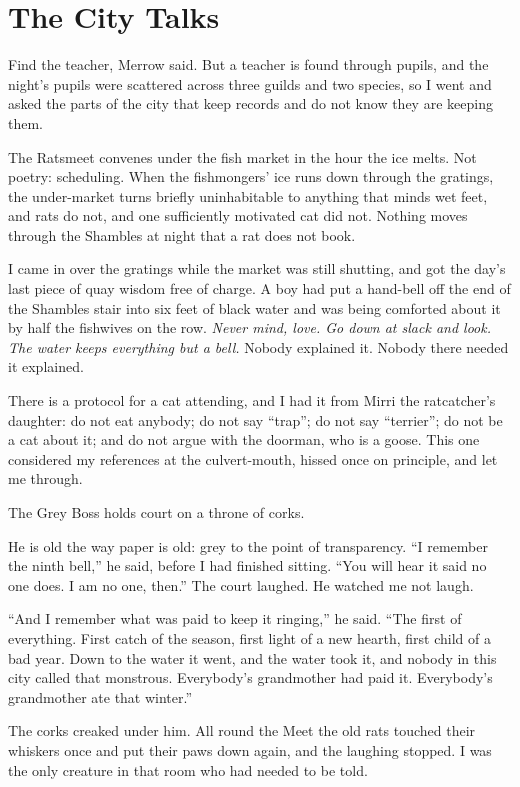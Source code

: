 \chapter{The City Talks}

Find the teacher, Merrow said. But a teacher is found through pupils, and the night's pupils were scattered across three guilds and two species, so I went and asked the parts of the city that keep records and do not know they are keeping them.

The Ratsmeet convenes under the fish market in the hour the ice melts. Not poetry: scheduling. When the fishmongers' ice runs down through the gratings, the under-market turns briefly uninhabitable to anything that minds wet feet, and rats do not, and one sufficiently motivated cat did not. Nothing moves through the Shambles at night that a rat does not book.

I came in over the gratings while the market was still shutting, and got the day's last piece of quay wisdom free of charge. A boy had put a hand-bell off the end of the Shambles stair into six feet of black water and was being comforted about it by half the fishwives on the row. \emph{Never mind, love. Go down at slack and look. The water keeps everything but a bell.} Nobody explained it. Nobody there needed it explained.

There is a protocol for a cat attending, and I had it from Mirri the ratcatcher's daughter: do not eat anybody; do not say ``trap''; do not say ``terrier''; do not be a cat about it; and do not argue with the doorman, who is a goose. This one considered my references at the culvert-mouth, hissed once on principle, and let me through.

The Grey Boss holds court on a throne of corks.

He is old the way paper is old: grey to the point of transparency. ``I remember the ninth bell,'' he said, before I had finished sitting. ``You will hear it said no one does. I am no one, then.'' The court laughed. He watched me not laugh.

``And I remember what was paid to keep it ringing,'' he said. ``The first of everything. First catch of the season, first light of a new hearth, first child of a bad year. Down to the water it went, and the water took it, and nobody in this city called that monstrous. Everybody's grandmother had paid it. Everybody's grandmother ate that winter.''

The corks creaked under him. All round the Meet the old rats touched their whiskers once and put their paws down again, and the laughing stopped. I was the only creature in that room who had needed to be told.

